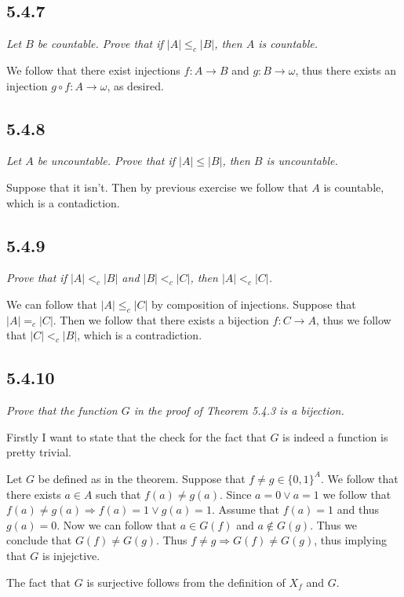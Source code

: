 \documentclass[11pt,oneside,titlepage]{book}
\DeclareMathOperator \ra {\Rightarrow}
\begin{document}
\subsection*{5.4.7}

\textit{Let $B$ be countable. Prove that if $|A| \leq_c |B|$, then $A$ is countable.}

We follow that there exist injections $f: A \to B$ and $g: B \to \omega$, thus there
exists an injection $g \circ f: A \to \omega$, as desired.

\subsection*{5.4.8}

\textit{Let $A$ be uncountable. Prove that if $|A| \leq |B|$, then $B$ is uncountable.}

Suppose that it isn't. Then by previous exercise we follow that $A$ is countable, which
is a contadiction.

\subsection*{5.4.9}

\textit{Prove that if $|A| <_c |B|$ and $|B| <_c |C|$, then $|A| <_c |C|$.}

We can follow that $|A| \leq_c |C|$ by composition of injections. Suppose that
$|A| =_c |C|$. Then we follow that there exists a bijection $f: C \to A$, thus
we follow that $|C| <_c |B|$, which is a contradiction.

\subsection*{5.4.10}

\textit{Prove that the function $G$ in the proof of Theorem 5.4.3 is a bijection.}

Firstly I want to state that the check for the fact that $G$ is indeed a function is pretty
trivial.

Let $G$ be defined as in the theorem. Suppose that $f \neq g \in \{0, 1\}^A$. We follow that
there exists $a \in A$ such that $f(a) \neq g(a)$. Since $a = 0 \lor a = 1$ we
follow that $f(a) \neq g(a) \ra f(a) = 1 \lor g(a) = 1$. Assume that $f(a) = 1$ and thus
$g(a) = 0$. Now we can follow that $a \in G(f)$ and $a \notin G(g)$. Thus we conclude that
$G(f) \neq G(g)$. Thus $f \neq g \ra G(f) \neq G(g)$, thus implying that $G$ is injejctive.

The fact that $G$ is surjective follows from the definition of $X_f$ and $G$.
\end{document}
